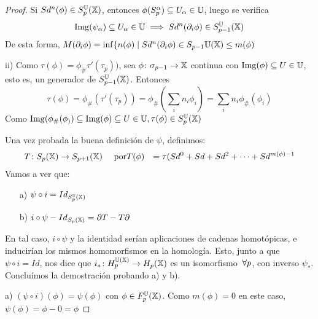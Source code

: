 \begin{proof}
  Si $Sd^n(\phi) \in S_p^{\mathbb U}({\mathbb X})$, entonces $\phi(S_p^\alpha) \subseteq U_\alpha \in {\mathbb U}$, luego se verifica
  \[ \operatorname{Img}(\psi_\alpha) \subseteq U_\alpha \in {\mathbb U} \implies Sd^n(\partial_i \phi) \in S_{p-1}^{\mathbb U}({\mathbb X}) \]
  De esta forma, $M(\partial_i \phi) = \inf\{n(\phi) \mid Sd^n(\partial_i \phi) \in S_{p-1}{\mathbb U}({\mathbb X}) \leq m(\phi)$

  ii) Como $\tau(\phi) = \phi_\# \tau'(\tau_p))$, sea $\phi \colon \sigma_{p-1} \to {\mathbb X}$ continua con $\operatorname{Img}(\phi) \subseteq U \in {\mathbb U}$, esto es,
  un generador de $S_{p-1}^{\mathbb U}({\mathbb X})$. Entonces
  \[ \tau(\phi) = \phi_\#(\tau'(\tau_p)) = \phi_\#(\sum_i n_i \phi_i) = \sum_i n_i \phi_\#(\phi_i) \]
  Como $\operatorname{Img}(\phi_\#(\phi_)) \subseteq \operatorname{Img}(\phi) \subseteq U \in {\mathbb U}, \tau(\phi) \in S_p^{\mathbb U}({\mathbb X})$

  Una vez probada la buena definición de $\psi$, definimos:
  \begin{align*}
    T \colon S_p({\mathbb X}) &\to S_{p+1}({\mathbb X}) \quad \text{ por}
    T(\phi) &= \tau(Sd^0 + Sd + Sd^2 + \dots + Sd^{m(\phi) - 1}
  \end{align*}
  Vamos a ver que:
  \begin{itemize}
    \item[a)] $\psi \circ i = Id_{S_p^{\mathbb U}({\mathbb X})}$
    \item[b)] $i \circ \psi - Id_{S_{p}({\mathbb X})} = \partial T - T \partial$
  \end{itemize}
  En tal caso, $i \circ \psi$ y la identidad serían aplicaciones de cadenas homotópicas, e inducirían los mismos homomorfismos en la homología.
  Esto, junto a que $\psi \circ i = Id$, nos dice que $i_* \colon H_p^{{\mathbb U}({\mathbb X})} \to H_p({\mathbb X})$ es un isomorfismo $\hspace{0.2em} \forall p$, con inverso $\psi_*$.
  Concluímos la demostración probando a) y b).

  a) $(\psi \circ i)(\phi) = \psi(\phi)$ con $\phi \in F_p^{\mathbb U}({\mathbb X})$. Como $m(\phi) = 0$ en este caso, $\psi(\phi) = \phi - 0 = \phi$


\end{proof}
